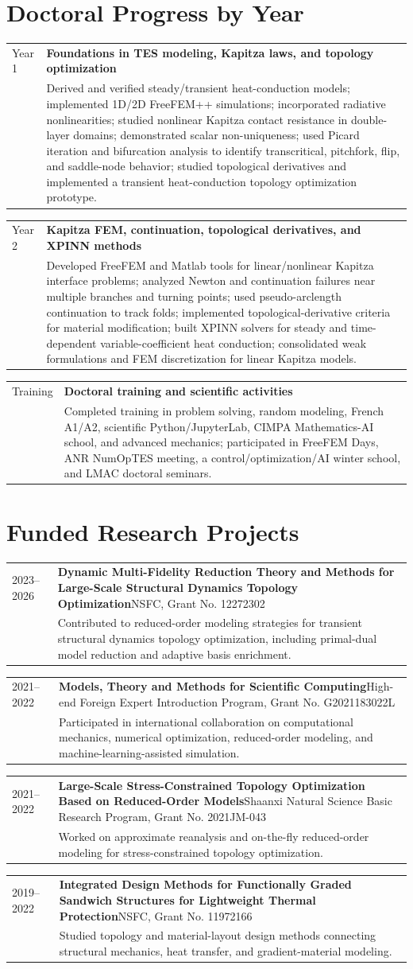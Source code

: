 \documentclass[8pt,a4paper]{extarticle}
\makeatletter
\newcommand{\cvitem}[4]{%
  \begin{tabularx}{\textwidth}{@{}p{1.85cm}X@{}}
    {\color{lightgray}\small #1} &
    \textbf{#2}{\color{lightgray}\small\quad #3}\\
    & {\color{textgray}\small #4}
  \end{tabularx}\vspace{0.1em}
}
\makeatother
\begin{document}
\section{Doctoral Progress by Year}
\cvitem{Year 1}{Foundations in TES modeling, Kapitza laws, and topology optimization}{}{Derived and verified steady/transient heat-conduction models; implemented 1D/2D FreeFEM++ simulations; incorporated radiative nonlinearities; studied nonlinear Kapitza contact resistance in double-layer domains; demonstrated scalar non-uniqueness; used Picard iteration and bifurcation analysis to identify transcritical, pitchfork, flip, and saddle-node behavior; studied topological derivatives and implemented a transient heat-conduction topology optimization prototype.}
\cvitem{Year 2}{Kapitza FEM, continuation, topological derivatives, and XPINN methods}{}{Developed FreeFEM and Matlab tools for linear/nonlinear Kapitza interface problems; analyzed Newton and continuation failures near multiple branches and turning points; used pseudo-arclength continuation to track folds; implemented topological-derivative criteria for material modification; built XPINN solvers for steady and time-dependent variable-coefficient heat conduction; consolidated weak formulations and FEM discretization for linear Kapitza models.}
\cvitem{Training}{Doctoral training and scientific activities}{}{Completed training in problem solving, random modeling, French A1/A2, scientific Python/JupyterLab, CIMPA Mathematics-AI school, and advanced mechanics; participated in FreeFEM Days, ANR NumOpTES meeting, a control/optimization/AI winter school, and LMAC doctoral seminars.}

\section{Funded Research Projects}
\cvitem{2023--2026}{Dynamic Multi-Fidelity Reduction Theory and Methods for Large-Scale Structural Dynamics Topology Optimization}{NSFC, Grant No. 12272302}{Contributed to reduced-order modeling strategies for transient structural dynamics topology optimization, including primal-dual model reduction and adaptive basis enrichment.}
\cvitem{2021--2022}{Models, Theory and Methods for Scientific Computing}{High-end Foreign Expert Introduction Program, Grant No. G2021183022L}{Participated in international collaboration on computational mechanics, numerical optimization, reduced-order modeling, and machine-learning-assisted simulation.}
\cvitem{2021--2022}{Large-Scale Stress-Constrained Topology Optimization Based on Reduced-Order Models}{Shaanxi Natural Science Basic Research Program, Grant No. 2021JM-043}{Worked on approximate reanalysis and on-the-fly reduced-order modeling for stress-constrained topology optimization.}
\cvitem{2019--2022}{Integrated Design Methods for Functionally Graded Sandwich Structures for Lightweight Thermal Protection}{NSFC, Grant No. 11972166}{Studied topology and material-layout design methods connecting structural mechanics, heat transfer, and gradient-material modeling.}
\end{document}
